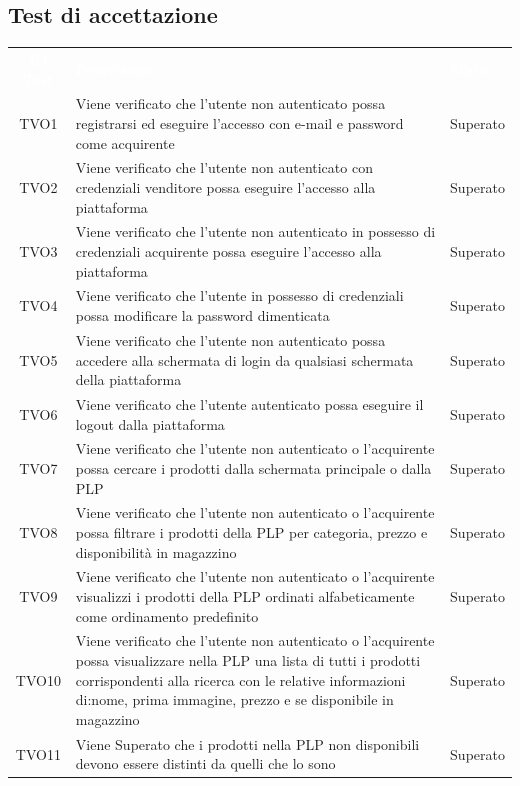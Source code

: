 \subsection{Test di accettazione}
\begin{longtable}{|c| C{10cm} |C{3cm}|}
	\textcolor{white}{\textbf{ID Test}}&
	\textcolor{white}{\textbf{Descrizione}}&
	\textcolor{white}{\textbf{Stato}}\label{tab:TestAccettazione}\\
	TVO1 & Viene verificato che l'utente non autenticato possa registrarsi ed eseguire l'accesso  con e-mail e password come acquirente & Superato\\ \hline
	TVO2 & Viene verificato che l'utente non autenticato con credenziali venditore possa eseguire l'accesso alla piattaforma & Superato\\ \hline
	TVO3 & Viene verificato che l'utente non autenticato in possesso di credenziali acquirente possa eseguire l'accesso alla piattaforma & Superato \\ \hline
	TVO4 & Viene verificato che l'utente in possesso di credenziali possa modificare la password dimenticata & Superato\\ \hline
	TVO5 & Viene verificato che l'utente non autenticato possa accedere alla schermata di login da qualsiasi schermata della piattaforma & Superato\\ \hline
	TVO6 & Viene verificato che l'utente autenticato possa eseguire il logout dalla piattaforma & Superato\\ \hline
	TVO7 & Viene verificato che l'utente non autenticato o l'acquirente possa cercare i prodotti dalla schermata principale o dalla PLP & Superato\\ \hline
	TVO8 & Viene verificato che l'utente non autenticato o l'acquirente possa filtrare i prodotti della PLP per categoria, prezzo e disponibilità in magazzino & Superato\\ \hline
	TVO9 & Viene verificato che l'utente non autenticato o l'acquirente visualizzi i prodotti della PLP ordinati alfabeticamente come ordinamento predefinito & Superato\\ \hline
	TVO10 & Viene verificato che l'utente non autenticato o l'acquirente possa visualizzare nella PLP una lista di tutti i prodotti corrispondenti alla ricerca con le relative informazioni di:nome, prima immagine, prezzo e se disponibile in magazzino & Superato \\ \hline
	TVO11 & Viene Superato che i prodotti nella PLP non disponibili devono essere distinti da quelli che lo sono & Superato \\ \hline

\end{longtable}
